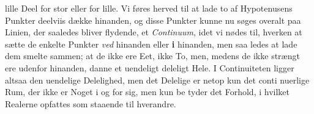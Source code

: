 \documentclass[12pt,a4paper]{book}
\begin{document}
lille Deel for stor eller for lille. Vi føres herved til at lade
to af Hypotenusens Punkter deelviis dække hinanden, og disse
Punkter kunne nu søges overalt paa Linien, der saaledes bliver
flydende, et \emph{Continuum}, idet vi nødes til, hverken at sætte
de enkelte Punkter \emph{ved} hinanden eller \textbf{i} hinanden, men saa\-%
ledes at lade dem smelte sammen; at de ikke ere Eet, ikke
To, men, medens de ikke strængt ere udenfor hinanden, danne
et uendeligt deleligt Hele. I Continuiteten ligger altsaa den
uendelige Delelighed, men det Delelige er netop kun det conti\-%
nuerlige Rum, der ikke er Noget i og for sig, men kun be\-%
tyder det Forhold, i hvilket Realerne opfattes som staaende til
hverandre.
\end{document}
